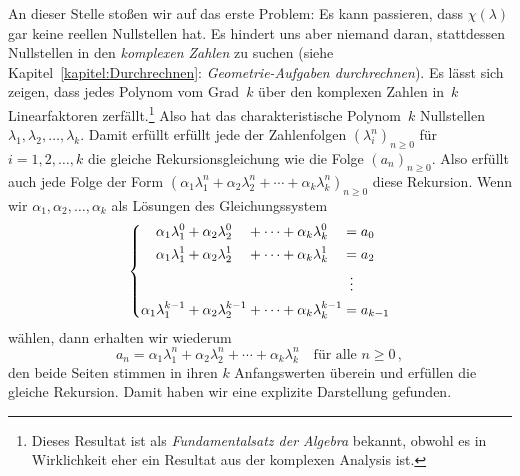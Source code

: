 An dieser Stelle stoßen wir auf das erste Problem: Es kann passieren, dass $\chi(\lambda)$ gar keine reellen Nullstellen hat. Es hindert uns aber niemand daran, stattdessen Nullstellen in den \emph{komplexen Zahlen} zu suchen (siehe Kapitel~\ref{kapitel:Durchrechnen}: \emph{Geometrie-Aufgaben durchrechnen}). Es lässt sich zeigen, dass jedes Polynom vom Grad~$k$ über den komplexen Zahlen in~$k$ Linearfaktoren zerfällt.\footnote{Dieses Resultat ist als \emph{Fundamentalsatz der Algebra} bekannt, obwohl es in Wirklichkeit eher ein Resultat aus der komplexen Analysis ist.} Also hat das charakteristische Polynom~$k$ Nullstellen $\lambda_1,\lambda_2,\dotsc,\lambda_k$. Damit erfüllt erfüllt jede der Zahlenfolgen $(\lambda_i^n)_{n\geqslant 0}$ für $i=1,2,\dotsc, k$ die gleiche Rekursionsgleichung wie die Folge $(a_n)_{n\geqslant 0}$. Also erfüllt auch jede Folge der Form $(\alpha_1\lambda_1^n+\alpha_2\lambda_2^n+\dotsb+\alpha_k\lambda_k^n)_{n\geqslant 0}$ diese Rekursion. Wenn wir $\alpha_1,\alpha_2,\dotsc,\alpha_k$ als Lösungen des Gleichungssystem
\newlength{\lengthofequals}
\settowidth{\lengthofequals}{$=$}
\begin{equation*}
	\left\{\begin{alignedat}{5}
		\alpha_1\lambda_1^0&+\alpha_2\lambda_2^0&&+\dotsb&&+\alpha_k\lambda_k^0&&=a_0\\
		\alpha_1\lambda_1^1&+\alpha_2\lambda_2^1&&+\dotsb&&+\alpha_k\lambda_k^1&&=a_2\\
		&&&&&&&\mathrel{\tikz[inner sep=0,outer sep=0]{\node at (0,-0.5ex) {$\phantom{=}$};\node at (0,0) {$\vdots$};}}\\
		\alpha_1\lambda_1^{k-1}&+\alpha_2\lambda_2^{k-1}&&+\dotsb&&+\alpha_k\lambda_k^{k-1}&&=a_{k-1}\\
	\end{alignedat}\right.
\end{equation*}
wählen, dann erhalten wir wiederum
\begin{equation*}
	a_n=\alpha_1\lambda_1^n+\alpha_2\lambda_2^n+\dotsb+\alpha_k\lambda_k^n\quad\text{für alle }n\geqslant 0\,,
\end{equation*}
den beide Seiten stimmen in ihren $k$ Anfangswerten überein und erfüllen die gleiche Rekursion. Damit haben wir eine explizite Darstellung gefunden.

